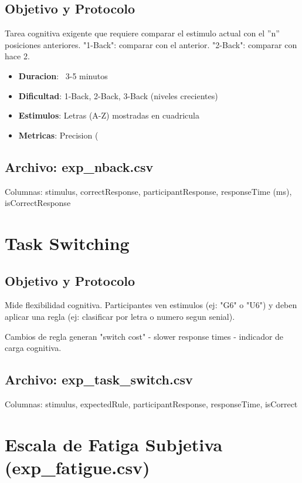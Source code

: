 \subsection{Objetivo y Protocolo}

Tarea cognitiva exigente que requiere comparar el estimulo actual con el ''n'' posiciones
anteriores. "1-Back": comparar con el anterior. "2-Back": comparar con hace 2.

\begin{itemize}
    \item \textbf{Duracion}: ~3-5 minutos
    \item \textbf{Dificultad}: 1-Back, 2-Back, 3-Back (niveles crecientes)
    \item \textbf{Estimulos}: Letras (A-Z) mostradas en cuadricula
    \item \textbf{Metricas}: Precision (%
\end{itemize}

\subsection{Archivo: exp\_nback.csv}

Columnas: stimulus, correctResponse, participantResponse, responseTime (ms), isCorrectResponse

\section{Task Switching}

\subsection{Objetivo y Protocolo}

Mide flexibilidad cognitiva. Participantes ven estimulos (ej: "G6" o "U6") y deben
aplicar una regla (ej: clasificar por letra o numero segun senial).

Cambios de regla generan "switch cost" - slower response times - indicador de
carga cognitiva.

\subsection{Archivo: exp\_task\_switch.csv}

Columnas: stimulus, expectedRule, participantResponse, responseTime, isCorrect

\section{Escala de Fatiga Subjetiva (exp\_fatigue.csv)}

